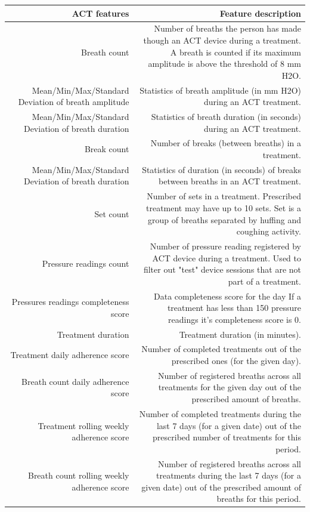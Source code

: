 \documentclass{article}
\begin{document}
\begin{longtable}{ n|d}
\toprule
\cmidrule(r){1-2}
\textbf{ACT features} & \textbf{Feature description} \\
\midrule
Breath count & Number of breaths the person has made though an ACT device during a treatment. A breath is counted if its maximum amplitude is above the threshold of 8 mm H2O.\\
 \midrule
 Mean/Min/Max/Standard Deviation of breath amplitude & Statistics of breath amplitude (in mm H2O) during an ACT treatment. \\
  \midrule
 Mean/Min/Max/Standard Deviation of breath duration & Statistics of breath duration (in seconds) during an ACT treatment. \\
 \midrule
 Break count & Number of breaks (between breaths) in a treatment. \\
 \midrule
 Mean/Min/Max/Standard Deviation of breath duration & Statistics of duration (in seconds) of breaks between breaths in an ACT treatment. \\
 \midrule
 Set count & Number of sets in a treatment. Prescribed treatment may have up to 10 sets. Set is a group of breaths separated by huffing and coughing activity. \\
 \midrule
 Pressure readings count & Number of pressure reading registered by ACT device during a treatment. Used to filter out "test" device sessions that are not part of a treatment. \\
 \midrule
 Pressures readings completeness score & Data completeness score for the day If a treatment has less than 150 pressure readings it's completeness score is 0. \\
 \midrule
 Treatment duration & Treatment duration (in minutes). \\
 \midrule
 Treatment daily adherence score & Number of completed treatments out of the prescribed ones (for the given day). \\
 \midrule
 Breath count daily adherence score & Number of registered breaths across all treatments for the given day out of the prescribed amount of breaths. \\ 
 \midrule
 Treatment rolling weekly adherence score & Number of completed treatments during the last 7 days (for a given date) out of the prescribed number of treatments for this period. \\
 \midrule
 Breath count rolling weekly adherence score & Number of registered breaths across all treatments during the last 7 days (for a given date) out of the prescribed amount of breaths for this period. \\ 

\end{longtable}
\end{document}
